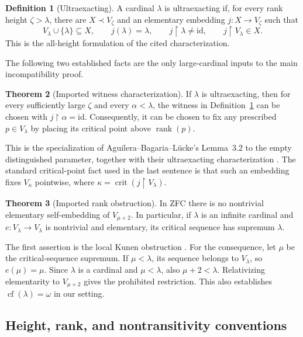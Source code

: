 \documentclass[11pt,letterpaper]{article}
\theoremstyle{definition}
\newtheorem{definition}{Definition}[section]
\newtheorem{theorem}[definition]{Theorem}
\newcommand{\crit}{\operatorname{crit}}
\newcommand{\cf}{\operatorname{cf}}
\newcommand{\rank}{\operatorname{rank}}
\newcommand{\id}{\mathrm{id}}
\newcommand{\restr}{\mathbin{\upharpoonright}}
\begin{document}
\begin{definition}[Ultraexacting]\label{def:uex}
A cardinal $\lambda$ is ultraexacting if, for every rank height $\zeta>\lambda$, there are $X\prec V_\zeta$ and an elementary embedding $j:X\to V_\zeta$ such that
\[
 V_\lambda\cup\{\lambda\}\subseteq X,
 \qquad j(\lambda)=\lambda,
 \qquad j\restr\lambda\ne\id,
 \qquad j\restr V_\lambda\in X.
\]
This is the all-height formulation of the cited characterization.
\end{definition}

The following two established facts are the only large-cardinal inputs to the main incompatibility proof.

\begin{theorem}[Imported witness characterization]\label{thm:highcrit}
If $\lambda$ is ultraexacting, then for every sufficiently large $\zeta$ and every $\alpha<\lambda$, the witness in Definition~\ref{def:uex} can be chosen with $j\restr\alpha=\id$. Consequently, it can be chosen to fix any prescribed $p\in V_\lambda$ by placing its critical point above $\rank(p)$.
\end{theorem}

This is the specialization of Aguilera--Bagaria--L\"ucke's Lemma~3.2 to the empty distinguished parameter, together with their ultraexacting characterization \cite{abl}. The standard critical-point fact used in the last sentence is that such an embedding fixes $V_\kappa$ pointwise, where $\kappa=\crit(j\restr V_\lambda)$.

\begin{theorem}[Imported rank obstruction]\label{thm:kunen}
In ZFC there is no nontrivial elementary self-embedding of $V_{\mu+2}$. In particular, if $\lambda$ is an infinite cardinal and $e:V_\lambda\to V_\lambda$ is nontrivial and elementary, its critical sequence has supremum $\lambda$.
\end{theorem}

The first assertion is the local Kunen obstruction \cite{kunen,hkp}. For the consequence, let $\mu$ be the critical-sequence supremum. If $\mu<\lambda$, its sequence belongs to $V_\lambda$, so $e(\mu)=\mu$. Since $\lambda$ is a cardinal and $\mu<\lambda$, also $\mu+2<\lambda$. Relativizing elementarity to $V_{\mu+2}$ gives the prohibited restriction. This also establishes $\cf(\lambda)=\omega$ in our setting.

\subsection{Height, rank, and nontransitivity conventions}
\end{document}

